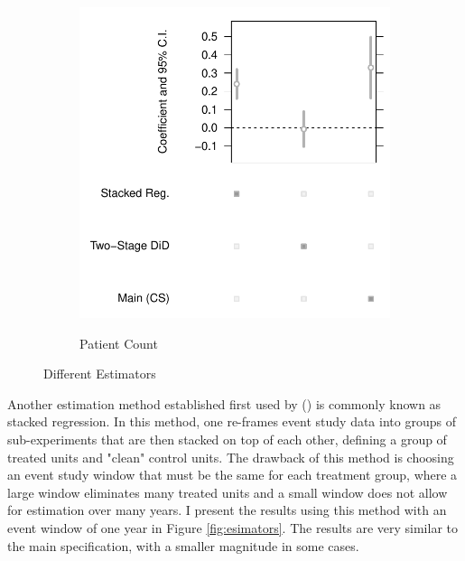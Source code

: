 \documentclass[12pt]{article}
\begin{document}
\begin{figure}[t!]
\medskip
\begin{subfigure}{0.48\textwidth}
\caption{Patient Count} 
\includegraphics[width=\linewidth]{Objects/claimperpatient_est_plot.pdf}
\label{fig:e}
\end{subfigure}\hspace*{\fill}

\caption{Different Estimators} \label{fig:estimators}
\end{figure}

Another estimation method established first used by \citeauthor{cengiz2019effect} (\citeyear{cengiz2019effect}) is commonly known as stacked regression. In this method, one re-frames event study data into groups of sub-experiments that are then stacked on top of each other, defining a group of treated units and "clean" control units. The drawback of this method is choosing an event study window that must be the same for each treatment group, where a large window eliminates many treated units and a small window does not allow for estimation over many years. I present the results using this method with an event window of one year in Figure \ref{fig:esimators}. The results are very similar to the main specification, with a smaller magnitude in some cases. 
\end{document}
